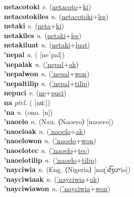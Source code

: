 \textbf{netacotoki} \textit{v.} (\hyperref[netacoto]{netacoto}+\hyperref[ki]{ki})
 \label{netacotoki} \\
\textbf{netacotokiles} \textit{n.} (\hyperref[netacotoki]{netacotoki}+\hyperref[les]{les})
 \label{netacotokiles} \\
\textbf{netaki} \textit{v.} (\hyperref[neta]{neta}+\hyperref[ki]{ki})
 \label{netaki} \\
\textbf{netakiles} \textit{n.} (\hyperref[netaki]{netaki}+\hyperref[les]{les})
 \label{netakiles} \\
\textbf{netakiluat} \textit{n.} (\hyperref[netaki]{netaki}+\hyperref[luat]{luat})
 \label{netakiluat} \\
\textbf{'nepal} \textit{n.} ( [neˈpal])
 \label{'nepal} \\
\textbf{'nepalak} \textit{n.} (\hyperref['nepal]{'nepal}+\hyperref[ak]{ak})
 \label{'nepalak} \\
\textbf{'nepalwon} \textit{n.} (\hyperref['nepal]{'nepal}+\hyperref[won]{won})
 \label{'nepalwon} \\
\textbf{'nepaltilip} \textit{n.} (\hyperref['nepal]{'nepal}+\hyperref[tilip]{tilip})
 \label{'nepaltilip} \\
\textbf{nepuci} \textit{v.} (\hyperref[ne]{ne}+\hyperref[puci]{puci})
 \label{nepuci} \\
\textbf{na} \textit{ptcl.} ( [nɑː])
 \label{na} \\
\textbf{'na} \textit{n.} (ono. [n])
 \label{'na} \\
\textbf{'naoelo} \textit{n.} (Nau. ⟨Naoero⟩ [naoero])
 \label{'naoelo} \\
\textbf{'naoeloak} \textit{n.} (\hyperref['naoelo]{'naoelo}+\hyperref[ak]{ak})
 \label{'naoeloak} \\
\textbf{'naoelowon} \textit{n.} (\hyperref['naoelo]{'naoelo}+\hyperref[won]{won})
 \label{'naoelowon} \\
\textbf{'naoelotec} \textit{n.} (\hyperref['naoelo]{'naoelo}+\hyperref[tec]{tec})
 \label{'naoelotec} \\
\textbf{'naoelotilip} \textit{n.} (\hyperref['naoelo]{'naoelo}+\hyperref[tilip]{tilip})
 \label{'naoelotilip} \\
\textbf{'nayciwia} \textit{n.} (Eng. ⟨Nigeria⟩ [naɪ̯ˈd͡ʒɪɹʷiə])
 \label{'nayciwia} \\
\textbf{'nayciwiaak} \textit{n.} (\hyperref['nayciwia]{'nayciwia}+\hyperref[ak]{ak})
 \label{'nayciwiaak} \\
\textbf{'nayciwiawon} \textit{n.} (\hyperref['nayciwia]{'nayciwia}+\hyperref[won]{won})
